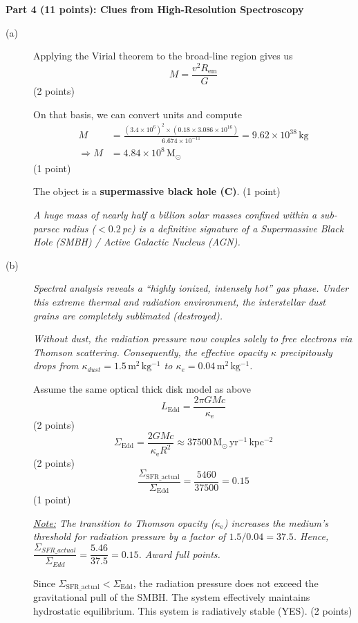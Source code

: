 \medskip\noindent\textbf{Part 4 (11 points): Clues from High-Resolution Spectroscopy}
\begin{description}
\item[(a)] Applying the Virial theorem to the broad-line region gives us
  \[ M = \frac{v^2 R_{\mathrm{em}}}{G} \]
  \hfill(2 points)

  On that basis, we can convert units and compute
  \begin{align*}
    M &= \frac{(3.4 \times 10^6)^2 \times (0.18 \times 3.086 \times 10^{16})}{6.674 \times 10^{-11}}
       = 9.62 \times 10^{38}\,\mathrm{kg} \\
    \Rightarrow M &= 4.84 \times 10^{8}\,\mathrm{M}_\odot
  \end{align*}
  \hfill(1 point)

  The object is a \textbf{supermassive black hole (C)}. \hfill(1 point)

  \emph{A huge mass of nearly half a billion solar masses confined within a
  sub-parsec radius ($< 0.2$\,pc) is a definitive signature of a Supermassive
  Black Hole (SMBH) / Active Galactic Nucleus (AGN).}

\item[(b)] \emph{Spectral analysis reveals a ``highly ionized, intensely
  hot'' gas phase. Under this extreme thermal and radiation environment, the
  interstellar dust grains are completely sublimated (destroyed).}

  \emph{Without dust, the radiation pressure now couples solely to free
  electrons via Thomson scattering. Consequently, the effective opacity
  $\kappa$ precipitously drops from
  $\kappa_{dust} = 1.5\,\mathrm{m^2\,kg^{-1}}$ to
  $\kappa_e = 0.04\,\mathrm{m^2\,kg^{-1}}$.}

  Assume the same optical thick disk model as above
  \[ L_{\mathrm{Edd}} = \frac{2\pi G M c}{\kappa_{\mathrm{e}}} \]
  \hfill(2 points)
  \[ \Sigma_{\mathrm{Edd}} = \frac{2 G M c}{\kappa_{\mathrm{e}} R^2}
     \approx 37500\,\mathrm{M_\odot\,yr^{-1}\,kpc^{-2}} \]
  \hfill(2 points)
  \[ \frac{\Sigma_{\mathrm{SFR\_actual}}}{\Sigma_{\mathrm{Edd}}}
     = \frac{5460}{37500} = 0.15 \]
  \hfill(1 point)

  \emph{\underline{Note:} The transition to Thomson opacity
  ($\kappa_{\mathrm{e}}$) increases the medium's threshold for radiation
  pressure by a factor of $1.5/0.04 = 37.5$. Hence,
  $\dfrac{\Sigma_{SFR\_actual}}{\Sigma_{Edd}} = \dfrac{5.46}{37.5} = 0.15$.
  Award full points.}

  Since $\Sigma_{\mathrm{SFR\_actual}} < \Sigma_{\mathrm{Edd}}$, the radiation
  pressure does not exceed the gravitational pull of the SMBH. The system
  effectively maintains hydrostatic equilibrium. This system is radiatively
  stable (YES). \hfill(2 points)
\end{description}

